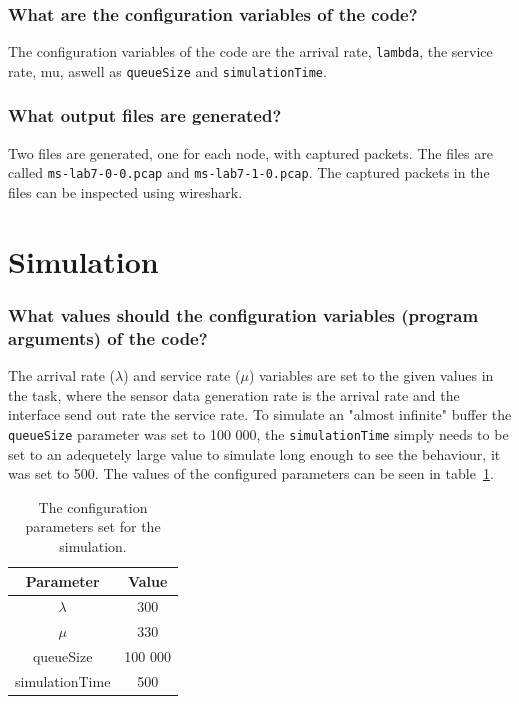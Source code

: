 \documentclass{article}
\begin{document}
    \subsubsection*{What are the configuration variables of the code?}
    The configuration variables of the code are the arrival rate, \verb|lambda|, the service rate, mu, aswell as \verb|queueSize| and \verb|simulationTime|.

    \subsubsection*{What output files are generated?}
    Two files are generated, one for each node, with captured packets. The files are called \verb|ms-lab7-0-0.pcap| and \verb|ms-lab7-1-0.pcap|. The captured packets in the files can be inspected using wireshark.

    \section{Simulation}

    \subsubsection*{What values should the configuration variables (program arguments) of the code?}
    The arrival rate ($\lambda$) and service rate ($\mu$) variables are set to the given values in the task, where the sensor data generation rate is the arrival rate and the interface send out rate the service rate. To simulate an "almost infinite" buffer the \verb|queueSize| parameter was set to 100 000, the \verb|simulationTime| simply needs to be set to an adequetely large value to simulate long enough to see the behaviour, it was set to 500. The values of the configured parameters can be seen in table \ref{tab:parameters}.

    \begin{table}[H]
        
        \begin{center}
        \begin{tabular}{ |c|c| } 
            \hline
        Parameter & Value \\\hline\hline
            $\lambda$ & 300 \\\hline 
            $\mu$ & 330 \\\hline
            queueSize & 100 000 \\\hline 
            simulationTime & 500 \\\hline
        \end{tabular}
        \end{center}
    \caption{The configuration parameters set for the simulation.}
    \label{tab:parameters}
    \end{table}
\end{document}
